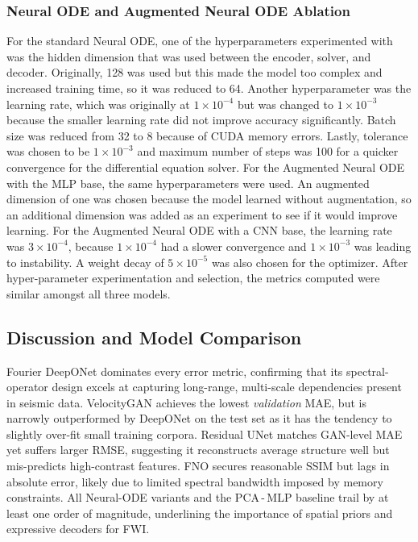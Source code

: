 \documentclass{article}
\begin{document}
\subsubsection{Neural ODE and Augmented Neural ODE Ablation}
For the standard Neural ODE, one of the hyperparameters experimented with was the hidden dimension that was used between the encoder, solver, and decoder. Originally, 128 was used but this made the model too complex and increased training time, so it was reduced to 64. Another hyperparameter was the learning rate, which was originally at $1 \times 10^{-4}$ but was changed to $1 \times 10^{-3}$ because the smaller learning rate did not improve accuracy significantly. Batch size was reduced from 32 to 8 because of CUDA memory errors. Lastly, tolerance was chosen to be $1 \times 10^{-3}$ and maximum number of steps was 100 for a quicker convergence for the differential equation solver. For the Augmented Neural ODE with the MLP base, the same hyperparameters were used. An augmented dimension of one was chosen because the model learned without augmentation, so an additional dimension was added as an experiment to see if it would improve learning. For the Augmented Neural ODE with a CNN base, the learning rate was $3\times 10^{-4}$, because $1 \times 10^{-4}$ had a slower convergence and $1 \times 10^{-3}$ was leading to instability. A weight decay of $5 \times 10^{-5}$ was also chosen for the optimizer. After hyper-parameter experimentation and selection, the metrics computed were similar amongst all three models.

\subsection{Discussion and Model Comparison}
Fourier DeepONet dominates every error metric, confirming that its
spectral-operator design excels at capturing long-range, multi-scale
dependencies present in seismic data.
VelocityGAN achieves the lowest \emph{validation} MAE, but is narrowly
outperformed by DeepONet on the test set as it has the tendency to
slightly over-fit small training corpora.
Residual UNet matches GAN-level MAE yet suffers larger RMSE, suggesting it
reconstructs average structure well but mis-predicts high-contrast features.
FNO secures reasonable SSIM but lags in absolute error, likely due to limited
spectral bandwidth imposed by memory constraints.
All Neural-ODE variants and the PCA\,-\,MLP baseline trail by at least one
order of magnitude, underlining the importance of spatial priors and expressive
decoders for FWI.
\end{document}

